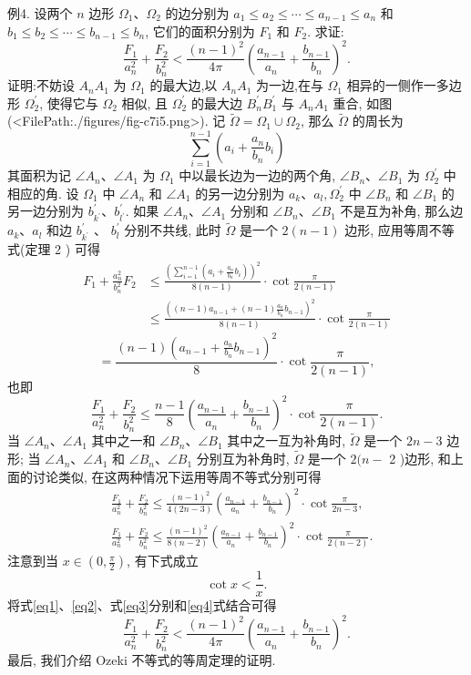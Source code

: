 例4. 设两个 $n$ 边形 $\Omega_1 、 \Omega_2$ 的边分别为 $a_1 \leqslant a_2 \leqslant \cdots \leqslant a_{n-1} \leqslant a_n$ 和 $b_1 \leqslant b_2 \leqslant \cdots \leqslant b_{n-1} \leqslant b_n$, 它们的面积分别为 $F_1$ 和 $F_2$. 求证:
$$
\frac{F_1}{a_n^2}+\frac{F_2}{b_n^2}<\frac{(n-1)^2}{4 \pi}\left(\frac{a_{n-1}}{a_n}+\frac{b_{n-1}}{b_n}\right)^2 .
$$
证明:不妨设 $A_n A_1$ 为 $\Omega_1$ 的最大边,以 $A_n A_1$ 为一边,在与 $\Omega_1$ 相异的一侧作一多边形 $\Omega_2^{\prime}$, 使得它与 $\Omega_2$ 相似, 且 $\Omega_2^{\prime}$ 的最大边 $B_n^{\prime} B_1^{\prime}$ 与 $A_n A_1$ 重合, 如图(<FilePath:./figures/fig-c7i5.png>). 记 $\widetilde{\Omega}=\Omega_1 \cup \Omega_2$, 那么 $\widetilde{\Omega}$ 的周长为
$$
\sum_{i=1}^{n-1}\left(a_i+\frac{a_n}{b_n} b_i\right)
$$
其面积为记 $\angle A_n 、 \angle A_1$ 为 $\Omega_1$ 中以最长边为一边的两个角, $\angle B_n 、 \angle B_1$ 为 $\Omega_2^{\prime}$ 中相应的角.
设 $\Omega_1$ 中 $\angle A_n$ 和 $\angle A_1$ 的另一边分别为 $a_k 、 a_l, \Omega_2^{\prime}$ 中 $\angle B_n$ 和 $\angle B_1$ 的另一边分别为 $b_{k^{\prime}}^{\prime} 、 b_{l^{\prime}}^{\prime}$.
如果 $\angle A_n 、 \angle A_1$ 分别和 $\angle B_n 、 \angle B_1$ 不是互为补角, 那么边 $a_k 、 a_l$ 和边 $b_{k^{\prime}}^{\prime}$ 、 $b_l^{\prime}$ 分别不共线, 此时 $\widetilde{\Omega}$ 是一个 $2(n-1)$ 边形, 应用等周不等式(定理 2 ) 可得
$$
\begin{aligned}
F_1+\frac{a_n^2}{b_n^2} F_2 & \leqslant \frac{\left(\sum_{i=1}^{n-1}\left(a_i+\frac{a_n}{b_n} b_i\right)\right)^2}{8(n-1)} \cdot \cot \frac{\pi}{2(n-1)} \\
& \leqslant \frac{\left((n-1) a_{n-1}+(n-1) \frac{a_n}{b_n} b_{n-1}\right)^2}{8(n-1)} \cdot \cot \frac{\pi}{2(n-1)}
\end{aligned}
$$
$$
=\frac{(n-1)\left(a_{n-1}+\frac{a_n}{b_n} b_{n-1}\right)^2}{8} \cdot \cot \frac{\pi}{2(n-1)},
$$
也即
$$
\frac{F_1}{a_n^2}+\frac{F_2}{b_n^2} \leqslant \frac{n-1}{8}\left(\frac{a_{n-1}}{a_n}+\frac{b_{n-1}}{b_n}\right)^2 \cdot \cot \frac{\pi}{2(n-1)} . \label{eq1}
$$
当 $\angle A_n 、 \angle A_1$ 其中之一和 $\angle B_n 、 \angle B_1$ 其中之一互为补角时, $\widetilde{\Omega}$ 是一个 $2 n-3$ 边形; 当 $\angle A_n 、 \angle A_1$ 和 $\angle B_n 、 \angle B_1$ 分别互为补角时, $\widetilde{\Omega}$ 是一个 $2(n-$ 2 )边形, 和上面的讨论类似, 在这两种情况下运用等周不等式分别可得
$$
\begin{aligned}
& \frac{F_1}{a_n^2}+\frac{F_2}{b_n^2} \leqslant \frac{(n-1)^2}{4(2 n-3)}\left(\frac{a_{n-1}}{a_n}+\frac{b_{n-1}}{b_n}\right)^2 \cdot \cot \frac{\pi}{2 n-3}, \label{eq2}\\
& \frac{F_1}{a_n^2}+\frac{F_2}{b_n^2} \leqslant \frac{(n-1)^2}{8(n-2)}\left(\frac{a_{n-1}}{a_n}+\frac{b_{n-1}}{b_n}\right)^2 \cdot \cot \frac{\pi}{2(n-2)} . \label{eq3}
\end{aligned}
$$
注意到当 $x \in\left(0, \frac{\pi}{2}\right)$, 有下式成立
$$
\cot x<\frac{1}{x} . \label{eq4}
$$
将式\ref{eq1}、\ref{eq2}、式\ref{eq3}分别和\ref{eq4}式结合可得
$$
\frac{F_1}{a_n^2}+\frac{F_2}{b_n^2}<\frac{(n-1)^2}{4 \pi}\left(\frac{a_{n-1}}{a_n}+\frac{b_{n-1}}{b_n}\right)^2 .
$$
最后, 我们介绍 Ozeki 不等式的等周定理的证明.



